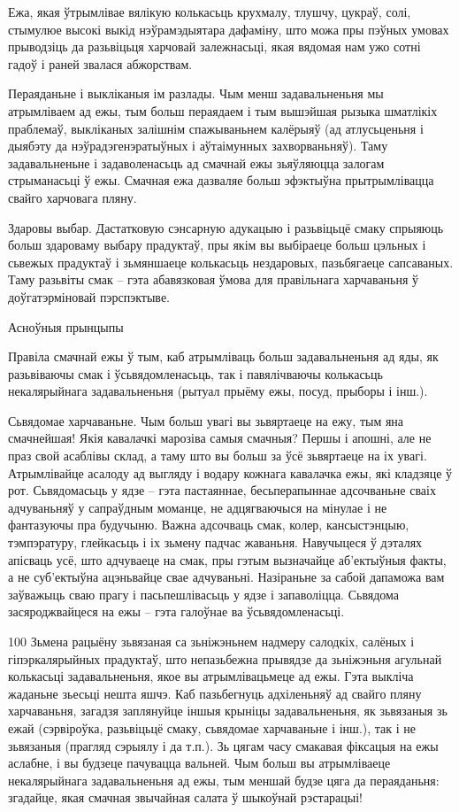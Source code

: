 Ежа, якая ўтрымлівае вялікую колькасьць крухмалу, тлушчу, цукраў, солі, стымулюе высокі выкід нэўрамэдыятара дафаміну, што можа пры пэўных умовах прыводзіць да разьвіцьця харчовай залежнасьці, якая вядомая нам ужо сотні гадоў і раней звалася абжорствам.

Пераяданьне і выкліканыя ім разлады.
Чым менш задавальненьня мы атрымліваем ад ежы, тым больш пераядаем і тым вышэйшая рызыка шматлікіх праблемаў, выкліканых залішнім спажываньнем калёрыяў (ад атлусьценьня і дыябэту да нэўрадэгенэратыўных і аўтаімунных захворваньняў). Таму задавальненьне і задаволенасьць ад смачнай ежы зьяўляюцца залогам стрыманасьці ў ежы. Смачная ежа дазваляе больш эфэктыўна прытрымлівацца свайго харчовага пляну.

Здаровы выбар.
Дастатковую сэнсарную адукацыю і разьвіцьцё смаку спрыяюць больш здароваму выбару прадуктаў, пры якім вы выбіраеце больш цэльных і сьвежых прадуктаў і зьмяншаеце колькасьць нездаровых, пазьбягаеце сапсаваных. Таму разьвіты смак – гэта абавязковая ўмова для правільнага харчаваньня ў доўгатэрміновай пэрспэктыве.

Асноўныя прынцыпы

Правіла смачнай ежы ў тым, каб атрымліваць больш задавальненьня ад яды, як разьвіваючы смак і ўсьвядомленасьць, так і павялічваючы колькасьць некалярыйнага задавальненьня (рытуал прыёму ежы, посуд, прыборы і інш.).

Сьвядомае харчаваньне.
Чым больш увагі вы зьвяртаеце на ежу, тым яна смачнейшая! Якія кавалачкі марозіва самыя смачныя? Першы і апошні, але не праз свой асаблівы склад, а таму што вы больш за ўсё зьвяртаеце на іх увагі. Атрымлівайце асалоду ад выгляду і водару кожнага кавалачка ежы, які кладзяце ў рот. Сьвядомасьць у ядзе – гэта пастаяннае, бесьперапыннае адсочваньне сваіх адчуваньняў у сапраўдным моманце, не адцягваючыся на мінулае і не фантазуючы пра будучыню. Важна адсочваць смак, колер, кансыстэнцыю, тэмпэратуру, глейкасьць і іх зьмену падчас жаваньня. Навучыцеся ў дэталях апісваць усё, што адчуваеце на смак, пры гэтым вызначайце аб'ектыўныя факты, а не суб'ектыўна ацэньвайце свае адчуваньні. Назіраньне за сабой дапаможа вам заўважыць сваю прагу і пасьпешлівасьць у ядзе і запаволіцца. Сьвядома засяроджвайцеся на ежы – гэта галоўнае ва ўсьвядомленасьці.

100%
Зьмена рацыёну зьвязаная са зьніжэньнем надмеру салодкіх, салёных і гіпэркалярыйных прадуктаў, што непазьбежна прывядзе да зьніжэньня агульнай колькасьці задавальненьня, якое вы атрымлівацьмеце ад ежы. Гэта выкліча жаданьне зьесьці нешта яшчэ. Каб пазьбегнуць адхіленьняў ад свайго пляну харчаваньня, загадзя заплянуйце іншыя крыніцы задавальненьня, як зьвязаныя зь ежай (сэрвіроўка, разьвіцьцё смаку, сьвядомае харчаваньне і інш.), так і не зьвязаныя (прагляд сэрыялу і да т.п.). Зь цягам часу смакавая фіксацыя на ежы аслабне, і вы будзеце пачувацца вальней. Чым больш вы атрымліваеце некалярыйнага задавальненьня ад ежы, тым меншай будзе цяга да пераяданьня: згадайце, якая смачная звычайная салата ў шыкоўнай рэстарацыі!

